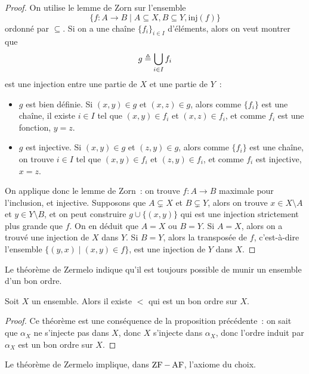 \begin{proof}
  On utilise le lemme de Zorn sur l'ensemble
  \[\{f : A \to B \mid A \subseteq X, B \subseteq Y, \mathrm{inj}(f)\}\]
  ordonné par $\subseteq$. Si on a une chaîne $\{f_i\}_{i\in I}$ d'éléments,
  alors on veut montrer que
  \[g\triangleq \bigcup_{i\in I} f_i\]
  est une injection entre une partie de $X$ et une partie de $Y$~:
  \begin{itemize}
  \item $g$ est bien définie. Si $(x,y)\in g$ et $(x,z)\in g$, alors comme
    $\{f_i\}$ est une chaîne, il existe $i\in I$ tel que $(x,y)\in f_i$ et
    $(x,z)\in f_i$, et comme $f_i$ est une fonction, $y=z$.
  \item $g$ est injective. Si $(x,y)\in g$ et $(z,y)\in g$, alors comme
    $\{f_i\}$ est une chaîne, on trouve $i\in I$ tel que $(x,y)\in f_i$ et
    $(z,y)\in f_i$, et comme $f_i$ est injective, $x=z$.
  \end{itemize}

  On applique donc le lemme de Zorn~: on trouve $f : A \to B$ maximale pour
  l'inclusion, et injective. Supposons que $A\subsetneq X$ et $B\subsetneq Y$,
  alors on trouve $x\in X\setminus A$ et $y\in Y\setminus B$, et on peut
  construire $g\cup\{(x,y)\}$ qui est une injection strictement plus grande
  que $f$. On en déduit que $A = X$ ou $B = Y$. Si $A = X$, alors on a trouvé
  une injection de $X$ dans $Y$. Si $B = Y$, alors la transposée de $f$,
  c'est-à-dire l'ensemble $\{(y,x)\mid (x,y)\in f\}$, est une injection de
  $Y$ dans $X$.
\end{proof}

Le théorème de Zermelo indique qu'il est toujours possible de munir un ensemble
d'un bon ordre.

\begin{theorem}[Zermelo]
  Soit $X$ un ensemble. Alors il existe $<$ qui est un bon ordre sur $X$.
\end{theorem}

\begin{proof}
  Ce théorème est une conséquence de la proposition précédente~: on sait que
  $\alpha_X$ ne s'injecte pas dans $X$, donc $X$ s'injecte dans $\alpha_X$,
  donc l'ordre induit par $\alpha_X$ est un bon ordre sur $X$.
\end{proof}

\begin{property}
  Le théorème de Zermelo implique, dans $\operatorname{ZF} - \operatorname{AF}$, l'axiome du choix.
\end{property}

